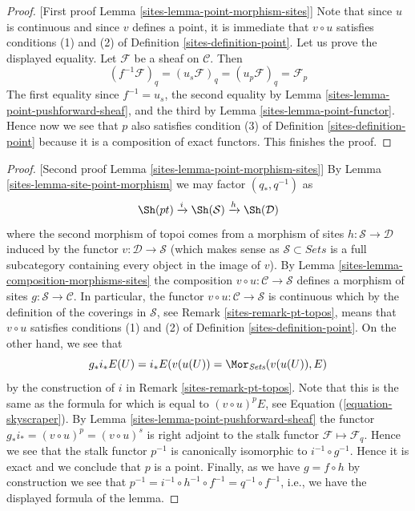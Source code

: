 \begin{proof}
[First proof Lemma \ref{sites-lemma-point-morphism-sites}]
Note that since $u$ is continuous and since $v$ defines a point,
it is immediate that $v \circ u$ satisfies conditions (1) and (2) of
Definition \ref{sites-definition-point}. Let us prove the displayed equality.
Let $\mathcal{F}$ be a sheaf on $\mathcal{C}$. Then
$$
(f^{-1}\mathcal{F})_q = (u_s\mathcal{F})_q =
(u_p \mathcal{F})_q = \mathcal{F}_p
$$
The first equality since $f^{-1} = u_s$, the second equality
by Lemma \ref{sites-lemma-point-pushforward-sheaf}, and the third
by Lemma \ref{sites-lemma-point-functor}.
Hence now we see that $p$ also satisfies condition (3) of
Definition \ref{sites-definition-point}
because it is a composition of exact functors. This finishes the proof.
\end{proof}

\begin{proof}
[Second proof Lemma \ref{sites-lemma-point-morphism-sites}]
By
Lemma \ref{sites-lemma-site-point-morphism}
we may factor $(q_*, q^{-1})$ as
$$
\Sh(pt) \xrightarrow{i} \Sh(\mathcal{S})
\xrightarrow{h} \Sh(\mathcal{D})
$$
where the second morphism of topoi comes from a morphism of sites
$h : \mathcal{S} \to \mathcal{D}$ induced by the functor
$v : \mathcal{D} \to \mathcal{S}$ (which makes sense as
$\mathcal{S} \subset \textit{Sets}$ is a full subcategory containing
every object in the image of $v$). By
Lemma \ref{sites-lemma-composition-morphisms-sites}
the composition $v \circ u : \mathcal{C} \to \mathcal{S}$
defines a morphism of sites $g : \mathcal{S} \to \mathcal{C}$.
In particular, the functor
$v \circ u : \mathcal{C} \to \mathcal{S}$
is continuous which by the definition of the coverings
in $\mathcal{S}$, see
Remark \ref{sites-remark-pt-topos},
means that $v \circ u$ satisfies conditions (1) and (2) of
Definition \ref{sites-definition-point}.
On the other hand, we see that
$$
g_*i_*E(U) = i_*E(v(u(U)) = \Mor_{\textit{Sets}}(v(u(U)), E)
$$
by the construction of $i$ in
Remark \ref{sites-remark-pt-topos}.
Note that this is the same as the formula for
which is equal to $(v \circ u)^pE$, see
Equation (\ref{equation-skyscraper}).
By
Lemma \ref{sites-lemma-point-pushforward-sheaf}
the functor $g_*i_* = (v \circ u)^p = (v \circ u)^s$
is right adjoint to the stalk functor
$\mathcal{F} \mapsto \mathcal{F}_q$.
Hence we see that the stalk functor $p^{-1}$ is canonically
isomorphic to $i^{-1} \circ g^{-1}$. Hence it is exact and
we conclude that $p$ is a point. Finally, as we have
$g = f \circ h$ by construction we see that
$p^{-1} = i^{-1} \circ h^{-1} \circ f^{-1} = q^{-1} \circ f^{-1}$,
i.e., we have the displayed formula of the lemma.
\end{proof}

